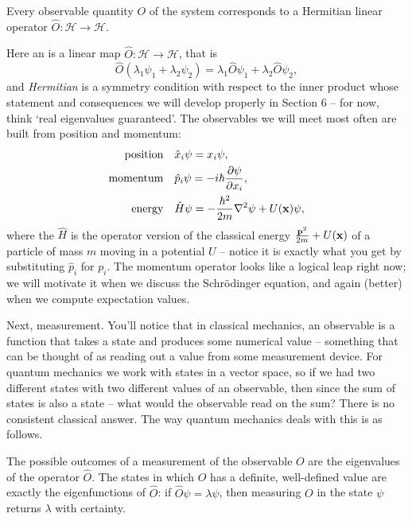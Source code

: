 \documentclass[a4paper]{scrartcl}
\begin{document}
\begin{axiom}[Observables]
    Every observable quantity $O$ of the system corresponds to a Hermitian linear operator $\hat{O}: \mathcal{H} \rightarrow \mathcal{H}$.
\end{axiom}

Here an  is a linear map $\hat{O} : \mathcal{H} \to \mathcal{H}$, that is
$$
\hat{O}(\lambda_1 \psi_1 + \lambda_2 \psi_2) = \lambda_1 \hat{O} \psi_1 + \lambda_2 \hat{O} \psi_2,
$$
and \emph{Hermitian} is a symmetry condition with respect to the inner product whose statement and consequences we will develop properly in Section 6 -- for now, think `real eigenvalues guaranteed'. The observables we will meet most often are built from position and momentum:
\begin{align*}
    \text{position} \quad & \hat{x}_i \psi = x_i \psi, \\
    \text{momentum} \quad & \hat{p}_i \psi = -i \hbar \frac{\partial \psi}{\partial x_i}, \\
    \text{energy} \quad & \hat{H} \psi = -\frac{\hbar^2}{2m} \nabla^2 \psi + U(\mathbf{x}) \psi,
\end{align*}
where the  $\hat{H}$ is the operator version of the classical energy $\frac{\mathbf{p}^2}{2m} + U(\mathbf{x})$ of a particle of mass $m$ moving in a potential $U$ -- notice it is exactly what you get by substituting $\hat{p}_i$ for $p_i$. The momentum operator looks like a logical leap right now; we will motivate it when we discuss the Schr\"odinger equation, and again (better) when we compute expectation values.

Next, measurement. You'll notice that in classical mechanics, an observable is a function that takes a state and produces some numerical value -- something that can be thought of as reading out a value from some measurement device. For quantum mechanics we work with states in a vector space, so if we had two different states with two different values of an observable, then since the sum of states is also a state -- what would the observable read on the sum? There is no consistent classical answer. The way quantum mechanics deals with this is as follows.

\begin{axiom}[Measurement]
    The possible outcomes of a measurement of the observable $O$ are the eigenvalues of the operator $\hat{O}$. The states in which $O$ has a definite, well-defined value are exactly the eigenfunctions of $\hat{O}$: if $\hat{O} \psi = \lambda \psi$, then measuring $O$ in the state $\psi$ returns $\lambda$ with certainty.
\end{axiom}
\end{document}
